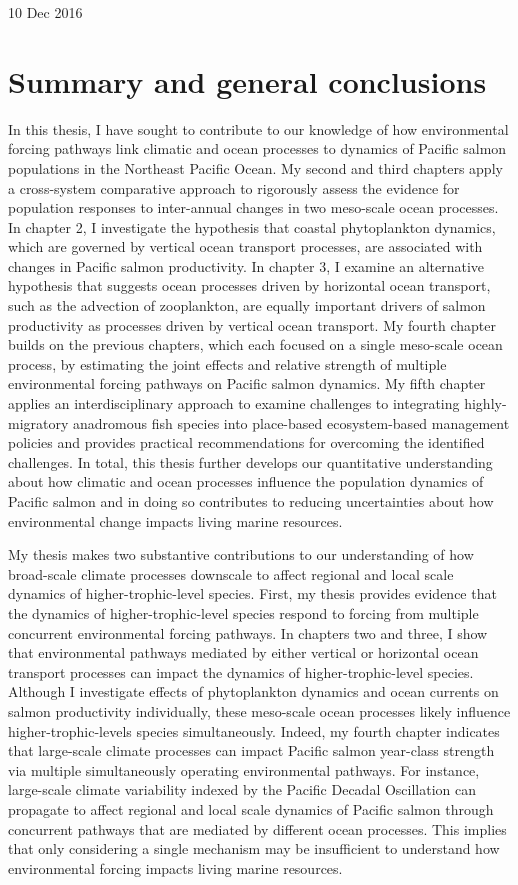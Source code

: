 10 Dec 2016

\chapter{Summary and general
conclusions}\label{summary-and-general-conclusions}

In this thesis, I have sought to contribute to our knowledge of how
environmental forcing pathways link climatic and ocean processes to
dynamics of Pacific salmon populations in the Northeast Pacific Ocean.
My second and third chapters apply a cross-system comparative approach
to rigorously assess the evidence for population responses to
inter-annual changes in two meso-scale ocean processes. In chapter 2, I
investigate the hypothesis that coastal phytoplankton dynamics, which
are governed by vertical ocean transport processes, are associated with
changes in Pacific salmon productivity. In chapter 3, I examine an
alternative hypothesis that suggests ocean processes driven by
horizontal ocean transport, such as the advection of zooplankton, are
equally important drivers of salmon productivity as processes driven by
vertical ocean transport. My fourth chapter builds on the previous
chapters, which each focused on a single meso-scale ocean process, by
estimating the joint effects and relative strength of multiple
environmental forcing pathways on Pacific salmon dynamics. My fifth
chapter applies an interdisciplinary approach to examine challenges to
integrating highly-migratory anadromous fish species into place-based
ecosystem-based management policies and provides practical
recommendations for overcoming the identified challenges. In total, this
thesis further develops our quantitative understanding about how
climatic and ocean processes influence the population dynamics of
Pacific salmon and in doing so contributes to reducing uncertainties
about how environmental change impacts living marine resources.

My thesis makes two substantive contributions to our understanding of
how broad-scale climate processes downscale to affect regional and local
scale dynamics of higher-trophic-level species. First, my thesis
provides evidence that the dynamics of higher-trophic-level species
respond to forcing from multiple concurrent environmental forcing
pathways. In chapters two and three, I show that environmental pathways
mediated by either vertical or horizontal ocean transport processes can
impact the dynamics of higher-trophic-level species. Although I
investigate effects of phytoplankton dynamics and ocean currents on
salmon productivity individually, these meso-scale ocean processes
likely influence higher-trophic-levels species simultaneously. Indeed,
my fourth chapter indicates that large-scale climate processes can
impact Pacific salmon year-class strength via multiple simultaneously
operating environmental pathways. For instance, large-scale climate
variability indexed by the Pacific Decadal Oscillation can propagate to
affect regional and local scale dynamics of Pacific salmon through
concurrent pathways that are mediated by different ocean processes. This
implies that only considering a single mechanism may be insufficient to
understand how environmental forcing impacts living marine resources.

